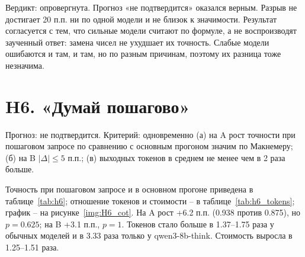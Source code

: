 \documentclass{bmstu}
\begin{document}

Вердикт: опровергнута. Прогноз «не подтвердится» оказался верным. Разрыв не достигает 20 п.п. ни по одной модели и не близок к значимости. Результат согласуется с тем, что сильные модели считают по формуле, а не воспроизводят заученный ответ: замена чисел не ухудшает их точность. Слабые модели ошибаются и там, и там, но по разным причинам, поэтому их разница тоже незначима.

\section{H6. «Думай пошагово»}
Прогноз: не подтвердится. Критерий: одновременно (а) на A рост точности при пошаговом запросе по сравнению с основным прогоном значим по Макнемеру; (б) на B $|\Delta|\le5$ п.п.; (в) выходных токенов в среднем не менее чем в 2 раза больше.

Точность при пошаговом запросе и в основном прогоне приведена в таблице~\ref{tab:h6}; отношение токенов и стоимости -- в таблице~\ref{tab:h6_tokens}; график -- на рисунке~\ref{img:H6_cot}. На A рост +6.2 п.п. (0.938 против 0.875), но $p=0.625$; на B +3.1 п.п., $p=1$. Токенов стало больше в 1.37--1.75 раза у обычных моделей и в 3.33 раза только у qwen3-8b-think. Стоимость выросла в 1.25--1.51 раза.

\begin{table}[htbp]
\centering
\caption{H6: точность при пошаговом запросе и в основном прогоне}
\label{tab:h6}
\vspace{-10pt}
\end{table}
\end{document}
